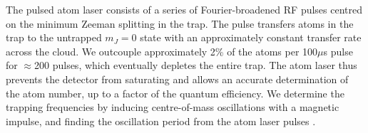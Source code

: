 	The pulsed atom laser consists of a series of Fourier-broadened RF pulses centred on the minimum Zeeman splitting in the trap. The pulse transfers atoms in the trap to the untrapped $m_J=0$ state with an approximately constant transfer rate across the cloud. We outcouple approximately 2\% of the atoms per 100$\mu$s pulse for $\approx$200 pulses, which eventually depletes the entire trap. The atom laser thus prevents the detector from saturating and allows an accurate determination of the atom number, up to a factor of the quantum efficiency. We determine the trapping frequencies by inducing centre-of-mass oscillations with a magnetic impulse, and finding the oscillation period from the atom laser pulses \cite{henson18ML}.

	


